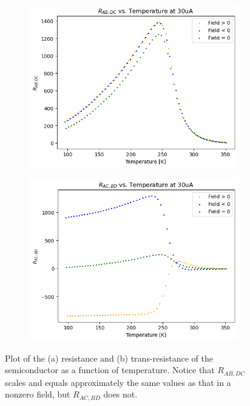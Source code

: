 \documentclass[10pt]{article}
\begin{document}
	\begin{figure}
		\centering
		\begin{subfigure}{0.45\textwidth}
			\includegraphics[width = \textwidth]{images/30uA-resistance.png}
			\caption{}
		\end{subfigure}
		\begin{subfigure}{0.45\textwidth}
			\includegraphics[width = \textwidth]{images/30uA-trans-resistance.png}
			\caption{}
		\end{subfigure}
		\caption{Plot of the (a) resistance and (b) trans-resistance of the semiconductor as a function of
			temperature. Notice that \( R_{AB, DC} \) scales and equals approximately the same values as that in
		a nonzero field, but \( R_{AC, BD} \) does not.}
		\label{res-figure}
	\end{figure}		
\end{document}
